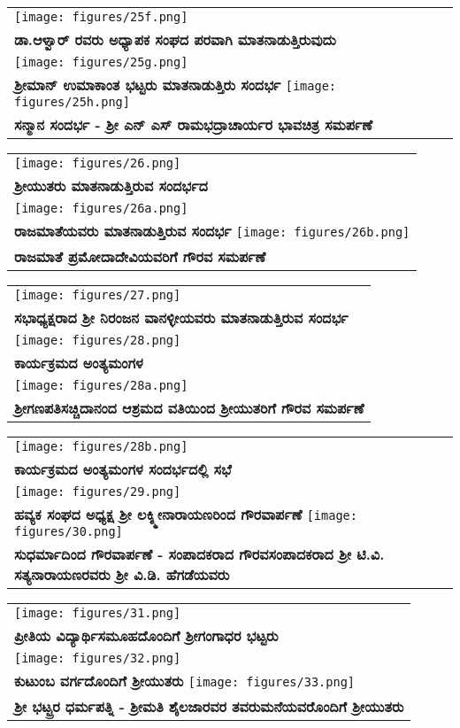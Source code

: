 {\tabcolsep=0pt
\noindent
\begin{tabular}{>{\centering}p{11cm}}
\texttt{[image: figures/25f.png]}\\
\textbf{ಡಾ.ಆಳ್ವಾರ್ ರವರು ಅಧ್ಯಾಪಕ ಸಂಘದ ಪರವಾಗಿ ಮಾತನಾಡುತ್ತಿರುವುದು}\\[12pt]
\texttt{[image: figures/25g.png]}\\
\textbf{ಶ್ರೀಮಾನ್ ಉಮಾಕಾಂತ ಭಟ್ಟರು ಮಾತನಾಡುತ್ತಿರು ಸಂದರ್ಭ}
\texttt{[image: figures/25h.png]}\\
\textbf{ಸನ್ಮಾನ ಸಂದರ್ಭ - ಶ್ರೀ ಎನ್ ಎಸ್ ರಾಮಭದ್ರಾಚಾರ್ಯರ ಭಾವಚಿತ್ರ ಸಮರ್ಪಣೆ}
\end{tabular}
}

{\tabcolsep=0pt
\noindent
\begin{tabular}{>{\centering}p{11cm}}
\texttt{[image: figures/26.png]}\\
\textbf{ ಶ್ರೀಯುತರು ಮಾತನಾಡುತ್ತಿರುವ ಸಂದರ್ಭದ}\\[12pt]
\texttt{[image: figures/26a.png]}\\
\textbf{ರಾಜಮಾತೆಯವರು ಮಾತನಾಡುತ್ತಿರುವ ಸಂದರ್ಭ}
\texttt{[image: figures/26b.png]}\\
\textbf{ರಾಜಮಾತೆ ಪ್ರಮೋದಾದೇವಿಯವರಿಗೆ ಗೌರವ ಸಮರ್ಪಣೆ}
\end{tabular}
}

{\tabcolsep=0pt
\noindent
\begin{tabular}{>{\centering}p{11cm}}
\texttt{[image: figures/27.png]}\\
\textbf{ಸಭಾಧ್ಯಕ್ಷರಾದ ಶ್ರೀ ನಿರಂಜನ ವಾನಳ್ಳೀಯವರು ಮಾತನಾಡುತ್ತಿರುವ ಸಂದರ್ಭ}\\[12pt]
\texttt{[image: figures/28.png]}\\
\textbf{ಕಾರ್ಯಕ್ರಮದ ಅಂತ್ಯಮಂಗಳ}\\
\texttt{[image: figures/28a.png]}\\
\textbf{ಶ್ರೀಗಣಪತಿಸಚ್ಚಿದಾನಂದ ಆಶ್ರಮದ ವತಿಯಿಂದ ಶ್ರೀಯುತರಿಗೆ ಗೌರವ ಸಮರ್ಪಣೆ}
\end{tabular}
}

{\tabcolsep=0pt
\noindent
\begin{tabular}{>{\centering}p{11cm}}
\texttt{[image: figures/28b.png]}\\
\textbf{ಕಾರ್ಯಕ್ರಮದ ಅಂತ್ಯಮಂಗಳ ಸಂದರ್ಭದಲ್ಲಿ ಸಭೆ}\\[12pt]
\texttt{[image: figures/29.png]}\\
\textbf{ಹವ್ಯಕ ಸಂಘದ ಅಧ್ಯಕ್ಷ ಶ್ರೀ ಲಕ್ಶ್ಮೀನಾರಾಯಣರಿಂದ ಗೌರವಾರ್ಪಣೆ}
\texttt{[image: figures/30.png]}\\
\textbf{ಸುಧರ್ಮಾದಿಂದ ಗೌರವಾರ್ಪಣೆ - ಸಂಪಾದಕರಾದ ಗೌರವಸಂಪಾದಕರಾದ ಶ್ರೀ ಟಿ.ವಿ. ಸತ್ಯನಾರಾಯಣರವರು ಶ್ರೀ ವಿ.ಡಿ. ಹೆಗಡೆಯವರು}
\end{tabular}
}

{\tabcolsep=0pt
\noindent
\begin{tabular}{>{\centering}p{11cm}}
\texttt{[image: figures/31.png]}\\
\textbf{ಪ್ರೀತಿಯ ವಿದ್ಯಾರ್ಥಿಸಮೂಹದೊಂದಿಗೆ ಶ್ರೀಗಂಗಾಧರ ಭಟ್ಟರು}\\[12pt]
\texttt{[image: figures/32.png]}\\
\textbf{ಕುಟುಂಬ ವರ್ಗದೊಂದಿಗೆ ಶ್ರೀಯುತರು}
\texttt{[image: figures/33.png]}\\
\textbf{ ಶ್ರೀ ಭಟ್ಟ್ರರ ಧರ್ಮಪತ್ನಿ - ಶ್ರೀಮತಿ ಶೈಲಜಾರವರ ತವರುಮನೆಯವರೊಂದಿಗೆ ಶ್ರೀಯುತರು}
\end{tabular}
}
